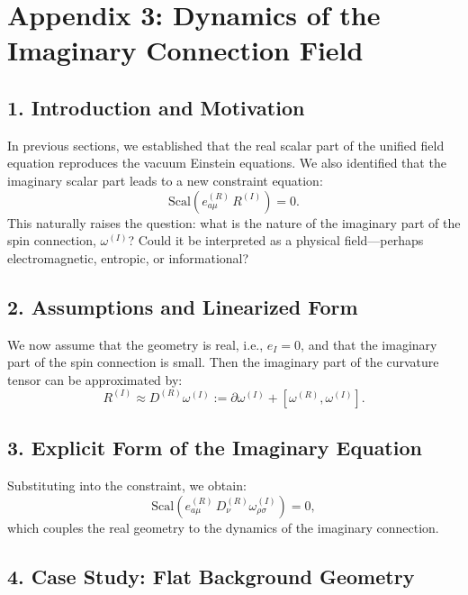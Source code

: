 

\section*{Appendix 3: Dynamics of the Imaginary Connection Field}

\subsection*{1. Introduction and Motivation}

In previous sections, we established that the real scalar part of the unified field equation reproduces the vacuum Einstein equations. We also identified that the imaginary scalar part leads to a new constraint equation:
\[
\text{Scal}\left(e^{(R)}_{a\mu} \, R^{(I)}\right) = 0.
\]
This naturally raises the question: what is the nature of the imaginary part of the spin connection, $\omega^{(I)}$? Could it be interpreted as a physical field—perhaps electromagnetic, entropic, or informational?

\subsection*{2. Assumptions and Linearized Form}

We now assume that the geometry is real, i.e., $e_I = 0$, and that the imaginary part of the spin connection is small. Then the imaginary part of the curvature tensor can be approximated by:
\[
R^{(I)} \approx D^{(R)} \omega^{(I)} := \partial \omega^{(I)} + [\omega^{(R)}, \omega^{(I)}].
\]

\subsection*{3. Explicit Form of the Imaginary Equation}

Substituting into the constraint, we obtain:
\[
\text{Scal}\left(e^{(R)}_{a\mu} \, D^{(R)}_\nu \omega^{(I)}_{\rho\sigma}\right) = 0,
\]
which couples the real geometry to the dynamics of the imaginary connection.

\subsection*{4. Case Study: Flat Background Geometry}

